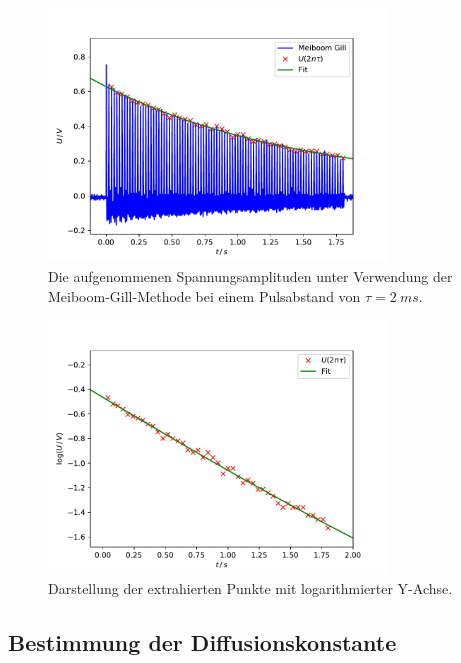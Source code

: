 \begin{figure}
  \centering
  \includegraphics[width=0.8\textwidth]{Plots2/T2.pdf}
  \caption{Die aufgenommenen Spannungsamplituden unter Verwendung der
  Meiboom-Gill-Methode bei einem Pulsabstand von $\tau = \SI{2}{ms}$.}
  \label{fig:T2}
\end{figure}
\begin{figure}
  \centering
  \includegraphics[width=0.8\textwidth]{Plots2/T2Log.pdf}
  \caption{Darstellung der extrahierten Punkte mit logarithmierter Y-Achse.}
  \label{fig:T2Log}
\end{figure}


\newpage
\subsection{Bestimmung der Diffusionskonstante}

